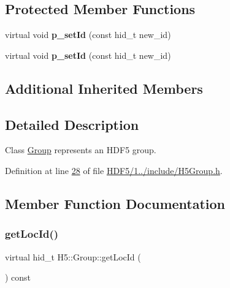 \subsection*{Protected Member Functions}
\begin{DoxyCompactItemize}
\item 
\mbox{\label{class_h5_1_1_group_af3ec5264e6d686eb6124892c7a2da926}} 
virtual void {\bfseries p\+\_\+set\+Id} (const hid\+\_\+t new\+\_\+id)
\item 
\mbox{\label{class_h5_1_1_group_af3ec5264e6d686eb6124892c7a2da926}} 
virtual void {\bfseries p\+\_\+set\+Id} (const hid\+\_\+t new\+\_\+id)
\end{DoxyCompactItemize}
\subsection*{Additional Inherited Members}


\subsection{Detailed Description}
Class \hyperlink{class_h5_1_1_group}{Group} represents an H\+D\+F5 group. 

Definition at line \hyperlink{_h_d_f5_21_810_81_2include_2_h5_group_8h_source_l00028}{28} of file \hyperlink{_h_d_f5_21_810_81_2include_2_h5_group_8h_source}{H\+D\+F5/1../include/\+H5\+Group.\+h}.



\subsection{Member Function Documentation}
\mbox{\label{class_h5_1_1_group_ae8fa39e9d934d254cd1bc2302a7e6391}} 
\subsubsection{\texorpdfstring{get\+Loc\+Id()}{getLocId()}\hspace{0.1cm}{\footnotesize\ttfamily [1/2]}}
{\footnotesize\ttfamily virtual hid\+\_\+t H5\+::\+Group\+::get\+Loc\+Id (\begin{DoxyParamCaption}{ }\end{DoxyParamCaption}) const\hspace{0.3cm}{\ttfamily [virtual]}}

